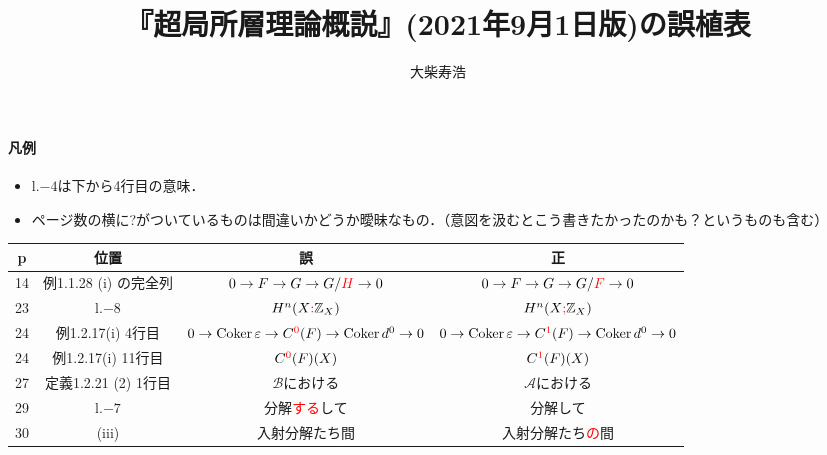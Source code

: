 

\def\inner<#1>{\langle #1 \rangle}








\title{『超局所層理論概説』(2021年9月1日版)の誤植表}
\author{大柴寿浩}

\maketitle
\paragraph{凡例}
\begin{itemize}
    \item l.\(-4\)は下から4行目の意味．
    \item ページ数の横に?がついているものは間違いかどうか曖昧なもの．（意図を汲むとこう書きたかったのかも？というものも含む）
\end{itemize}
\begin{table}[h]
    \centering
    \begin{tabular}{|c|c|c|c|}
    \hline
    \rowcolor{lightgray}p&位置 & 誤 & 正 \\
    \hline
        14&例1.1.28 (i) の完全列&\(0\to F\to G\to G/\textcolor{red}{H}\to0\)&\(0\to F\to G\to G/\textcolor{red}{F}\to0\)\\    
    \hline
        23&l.\(-8\)&\(H^n(X\textcolor{red}{:}\mathbb{Z}_X)\)&\(H^n(X\textcolor{red}{;}\mathbb{Z}_X)\)\\
    \hline
        24&例1.2.17(i) 4行目&
        \(0\to \mathop{\mathrm{Coker}}\nolimits\varepsilon\to C^{\textcolor{red}{0}}(F)\to\mathop{\mathrm{Coker}}\nolimits{d^0}\to0\)
        &\(0\to \mathop{\mathrm{Coker}}\nolimits\varepsilon\to C^{\textcolor{red}{1}}(F)\to\mathop{\mathrm{Coker}}\nolimits{d^0}\to0\)\\
    \hline
        24&例1.2.17(i) 11行目&
        \(C^{\textcolor{red}{0}}(F)(X)\)&\(C^{\textcolor{red}{1}}(F)(X)\)\\
    \hline
        27&定義1.2.21 (2) 1行目&\(\mathcal{B}\)における&\(\mathcal{A}\)における\\
    \hline
        29&l.\(-7\)&分解\textcolor{red}{する}して&分解して\\
    \hline
        30&(iii)&入射分解たち間&入射分解たち\textcolor{red}{の}間\\
        \hline
\end{tabular}
\end{table}

